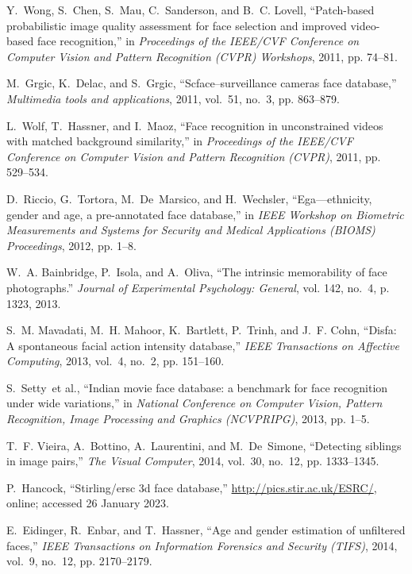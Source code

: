 \documentclass[journal]{IEEEtran}
\begin{document}
\begin{thebibliography}{100}
Y.~Wong, S.~Chen, S.~Mau, C.~Sanderson, and B.~C. Lovell, ``Patch-based probabilistic image quality assessment for face selection and improved video-based face recognition,'' in \emph{Proceedings of the IEEE/CVF Conference on Computer Vision and Pattern Recognition (CVPR) Workshops}, 2011, pp. 74--81.

M.~Grgic, K.~Delac, and S.~Grgic, ``Scface--surveillance cameras face database,'' \emph{Multimedia tools and applications}, 2011, vol.~51, no.~3, pp.
  863--879.

L.~Wolf, T.~Hassner, and I.~Maoz, ``Face recognition in unconstrained videos with matched background similarity,'' in \emph{Proceedings of the IEEE/CVF Conference on Computer Vision and Pattern Recognition (CVPR)}, 2011, pp. 529--534.

D.~Riccio, G.~Tortora, M.~De~Marsico, and H.~Wechsler, ``Ega—ethnicity, gender and age, a pre-annotated face database,'' in \emph{IEEE Workshop
  on Biometric Measurements and Systems for Security and Medical Applications (BIOMS) Proceedings}, 2012, pp.
  1--8.

W.~A. Bainbridge, P.~Isola, and A.~Oliva, ``The intrinsic memorability of face photographs.'' \emph{Journal of Experimental Psychology: General}, vol. 142,
  no.~4, p. 1323, 2013.

S.~M. Mavadati, M.~H. Mahoor, K.~Bartlett, P.~Trinh, and J.~F. Cohn, ``Disfa: A spontaneous facial action intensity database,'' \emph{IEEE Transactions on Affective Computing}, 2013, vol.~4, no.~2, pp. 151--160.

S.~Setty~et al., ``Indian movie face database: a benchmark for face recognition under wide variations,'' in \emph{National Conference on Computer Vision, Pattern Recognition, Image Processing and Graphics (NCVPRIPG)}, 2013, pp. 1--5.

T.~F. Vieira, A.~Bottino, A.~Laurentini, and M.~De~Simone, ``Detecting siblings in image pairs,'' \emph{The Visual Computer}, 2014, vol.~30, no.~12, pp. 1333--1345.

P.~Hancock, ``Stirling/ersc 3d face database,''
  \url{http://pics.stir.ac.uk/ESRC/}, online; accessed 26 January 2023.

E.~Eidinger, R.~Enbar, and T.~Hassner, ``Age and gender estimation of unfiltered faces,'' \emph{IEEE Transactions on Information Forensics and Security (TIFS)}, 2014, vol.~9, no.~12, pp. 2170--2179.


\end{thebibliography}
\end{document}

